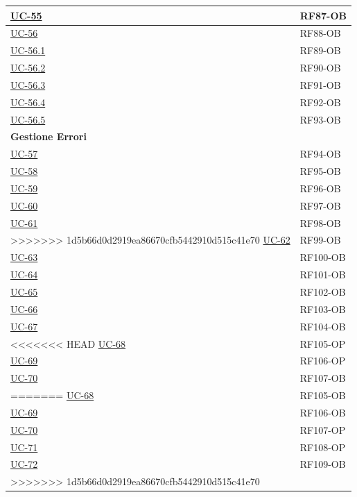 ﻿\documentclass[a4paper,12pt]{article}
\begin{document}
\begin{description}[style=multiline, leftmargin=4cm, font=\bfseries]
\begin{enumerate}[leftmargin=*, nosep]
{\begin{longtable}{|p{4cm}|p{4cm}|}
    \hline
    \hyperref[fig:uc-55]{UC-55} & RF87-OB \\
    \hline
    \hyperref[fig:uc-56]{UC-56} & RF88-OB \\
    \hline
    \hyperref[fig:uc-56.1]{UC-56.1} & RF89-OB \\
    \hline
    \hyperref[fig:uc-56.2]{UC-56.2} & RF90-OB \\
    \hline
    \hyperref[fig:uc-56.3]{UC-56.3} & RF91-OB \\
    \hline
    \hyperref[fig:uc-56.4]{UC-56.4} & RF92-OB \\
    \hline
    \hyperref[fig:uc-56.5]{UC-56.5} & RF93-OB \\
    \hline

    \multicolumn{2}{|l|}{\cellcolor{gray!12}\textbf{Gestione Errori}} \\
    \hline
    \hyperref[errore-uc-57]{UC-57} & RF94-OB \\
    \hline
    \hyperref[errore-uc-58]{UC-58} & RF95-OB \\
    \hline
    \hyperref[errore-uc-59]{UC-59} & RF96-OB \\
    \hline
    \hyperref[errore-uc-60]{UC-60} & RF97-OB \\
    \hline
    \hyperref[errore-uc-61]{UC-61} & RF98-OB \\
    \hline
>>>>>>> 1d5b66d0d2919ea86670cfb5442910d515c41e70
    \hyperref[errore-uc-62]{UC-62} & RF99-OB \\
    \hline
    \hyperref[errore-uc-63]{UC-63} & RF100-OB \\
    \hline
    \hyperref[errore-uc-64]{UC-64} & RF101-OB \\
    \hline
    \hyperref[errore-uc-65]{UC-65} & RF102-OB \\
    \hline
    \hyperref[errore-uc-66]{UC-66} & RF103-OB \\
    \hline
    \hyperref[errore-uc-67]{UC-67} & RF104-OB \\
    \hline
<<<<<<< HEAD
    \hyperref[errore-uc-68]{UC-68} & RF105-OP \\
    \hline
    \hyperref[errore-uc-69]{UC-69} & RF106-OP \\
    \hline
    \hyperref[errore-uc-70]{UC-70} & RF107-OB \\
=======
    \hyperref[errore-uc-68]{UC-68} & RF105-OB \\
    \hline
    \hyperref[errore-uc-69]{UC-69} & RF106-OB \\
    \hline
    \hyperref[errore-uc-70]{UC-70} & RF107-OP \\
    \hline
    \hyperref[errore-uc-71]{UC-71} & RF108-OP \\
    \hline
    \hyperref[errore-uc-72]{UC-72} & RF109-OB \\
>>>>>>> 1d5b66d0d2919ea86670cfb5442910d515c41e70
    \hline


\end{longtable}}
\end{enumerate}
\end{description}
\end{document}
